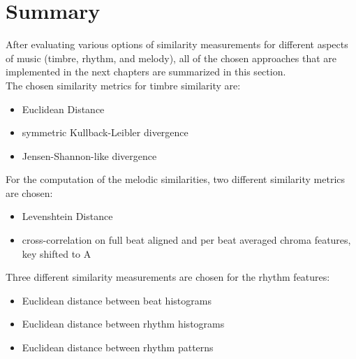 \section{Summary}\label{sumfeat}

After evaluating various options of similarity measurements for different aspects of music (timbre, rhythm, and melody), all of the chosen approaches that are implemented in the next chapters are summarized in this section.\\
The chosen similarity metrics for timbre similarity are: 
\begin{itemize}
	\setlength\itemsep{-0.5em}
	\item Euclidean Distance
	\item symmetric Kullback-Leibler divergence
	\item Jensen-Shannon-like divergence
\end{itemize}
For the computation of the melodic similarities, two different similarity metrics are chosen: 
\begin{itemize}
	\setlength\itemsep{-0.5em}
	\item Levenshtein Distance 
	\item cross-correlation on full beat aligned and per beat averaged chroma features, key shifted to A
\end{itemize}
Three different similarity measurements are chosen for the rhythm features: 
\begin{itemize}
	\setlength\itemsep{-0.5em}
	\item Euclidean distance between beat histograms
	\item Euclidean distance between rhythm histograms
	\item Euclidean distance between rhythm patterns
\end{itemize}



